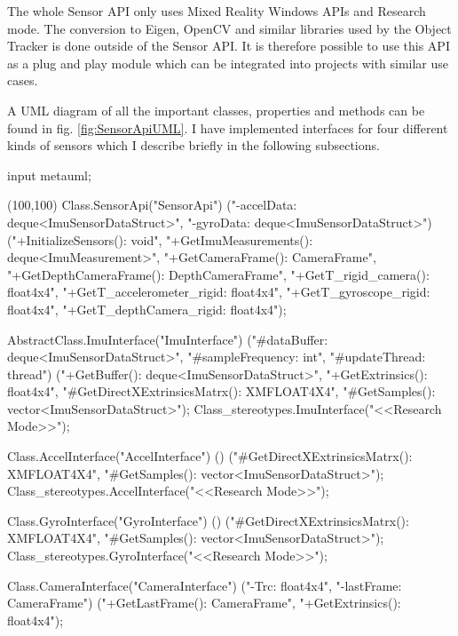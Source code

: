 The whole Sensor API only uses Mixed Reality Windows APIs and Research mode. The conversion to Eigen, OpenCV and similar libraries used by the Object Tracker is done outside of the Sensor API. It is therefore possible to use this API as a plug and play module which can be integrated into projects with similar use cases.

A UML diagram of all the important classes, properties and methods can be found in fig. \ref{fig:SensorApiUML}. I have implemented interfaces for four different kinds of sensors which I describe briefly in the following subsections.

\begin{empfile}[SensorApiUML]
\begin{empcmds}
input metauml;
\end{empcmds}
\begin{empdef}[SensorApiUML](100,100)
    Class.SensorApi("SensorApi")
           ("-accelData: deque<ImuSensorDataStruct>",
            "-gyroData: deque<ImuSensorDataStruct>") 
            ("+InitializeSensors(): void",
             "+GetImuMeasurements(): deque<ImuMeasurement>",
             "+GetCameraFrame(): CameraFrame",
             "+GetDepthCameraFrame(): DepthCameraFrame",
             "+GetT_rigid_camera(): float4x4",
             "+GetT_accelerometer_rigid: float4x4",
             "+GetT_gyroscope_rigid: float4x4",
             "+GetT_depthCamera_rigid: float4x4");
             
    AbstractClass.ImuInterface("ImuInterface")
            ("#dataBuffer: deque<ImuSensorDataStruct>",
             "#sampleFrequency: int",
             "#updateThread: thread")
            ("+GetBuffer(): deque<ImuSensorDataStruct>",
             "+GetExtrinsics(): float4x4",
             "#GetDirectXExtrinsicsMatrx(): XMFLOAT4X4",
             "#GetSamples(): vector<ImuSensorDataStruct>");
    Class_stereotypes.ImuInterface("<<Research Mode>>");
             
    Class.AccelInterface("AccelInterface")
            ()
            ("#GetDirectXExtrinsicsMatrx(): XMFLOAT4X4",
             "#GetSamples(): vector<ImuSensorDataStruct>");
    Class_stereotypes.AccelInterface("<<Research Mode>>");
             
    Class.GyroInterface("GyroInterface")
            ()
            ("#GetDirectXExtrinsicsMatrx(): XMFLOAT4X4",
             "#GetSamples(): vector<ImuSensorDataStruct>");
    Class_stereotypes.GyroInterface("<<Research Mode>>");
             
    Class.CameraInterface("CameraInterface")
            ("-Trc: float4x4",
             "-lastFrame: CameraFrame")
            ("+GetLastFrame(): CameraFrame",
             "+GetExtrinsics(): float4x4");
             

\end{empdef}
\end{empfile}
